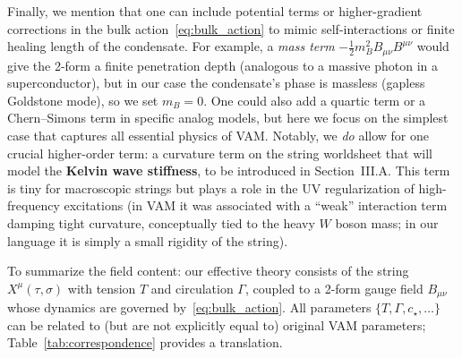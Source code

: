 \documentclass[12pt]{article}
\begin{document}
Finally, we mention that one can include potential terms or higher-gradient corrections in the bulk action~\eqref{eq:bulk_action} to mimic self-interactions or finite healing length of the condensate. For example, a \emph{mass term} $-\frac{1}{2} m_B^2 B_{\mu\nu}B^{\mu\nu}$ would give the 2-form a finite penetration depth (analogous to a massive photon in a superconductor), but in our case the condensate's phase is massless (gapless Goldstone mode), so we set $m_B=0$. One could also add a quartic term or a Chern--Simons term in specific analog models, but here we focus on the simplest case that captures all essential physics of VAM. Notably, we \emph{do} allow for one crucial higher-order term: a curvature term on the string worldsheet that will model the \textbf{Kelvin wave stiffness}, to be introduced in Section~III.A. This term is tiny for macroscopic strings but plays a role in the UV regularization of high-frequency excitations (in VAM it was associated with a ``weak'' interaction term damping tight curvature, conceptually tied to the heavy $W$ boson mass; in our language it is simply a small rigidity of the string).

To summarize the field content: our effective theory consists of the string $X^\mu(\tau,\sigma)$ with tension $T$ and circulation $\Gamma$, coupled to a 2-form gauge field $B_{\mu\nu}$ whose dynamics are governed by~\eqref{eq:bulk_action}. All parameters $\{T,\Gamma,c_\star,\ldots\}$ can be related to (but are not explicitly equal to) original VAM parameters; Table~\ref{tab:correspondence} provides a translation.
\end{document}
